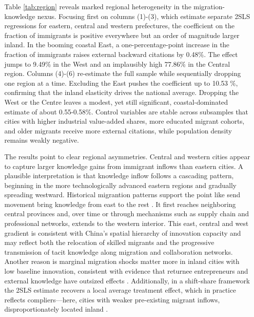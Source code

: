 \documentclass[12pt]{article}
\begin{document}
Table \ref{tab:region} reveals marked regional heterogeneity in the migration-knowledge nexus. Focusing first on columns (1)-(3), which estimate separate 2SLS regressions for eastern, central and western prefectures, the coefficient on the fraction of immigrants is positive everywhere but an order of magnitude larger inland. In the booming coastal East, a one-percentage-point increase in the fraction of immigrants raises external backward citations by 0.48\%. The effect jumps to 9.49\% in the West and an implausibly high 77.86\% in the Central region. 
Columns (4)-(6) re-estimate the full sample while sequentially dropping one region at a time. Excluding the East pushes the coefficient up to 10.53 \%, confirming that the inland elasticity drives the national average. Dropping the West or the Centre leaves a modest, yet still significant, coastal-dominated estimate of about 0.55-0.58\%. Control variables are stable across subsamples that cities with higher industrial value-added shares, more educated migrant cohorts, and older migrants receive more external citations, while population density remains weakly negative.

The results point to clear regional asymmetries. Central and western cities appear to capture larger knowledge gains from immigrant inflows than eastern cities. A plausible interpretation is that knowledge inflow follows a cascading pattern, beginning in the more technologically advanced eastern regions and gradually spreading westward. Historical migrantion patterns support the point like send movement bring knowledge from east to the rest \citep{chenArrivalYoungTalent2020}. It first reaches neighboring central provinces and, over time or through mechanisms such as supply chain and professional networks, extends to the western interior. This east, central and west gradient is consistent with China's spatial hierarchy of innovation capacity and may reflect both the relocation of skilled migrants and the progressive transmission of tacit knowledge along migration and collaboration networks.
Another reason is marginal migration shocks matter more in inland cities with low baseline innovation, consistent with evidence that returnee entrepreneurs and external knowledge have outsized effects \citep{qiaoReturneesInnovationEvidence2024}.
Additionally, in a shift-share framework the 2SLS estimate recovers a local average treatment effect, which in practice reflects compliers—here, cities with weaker pre-existing migrant inflows, disproportionately located inland \citep{sequeiraImmigrantsMakingAmerica2020}.
\end{document}

